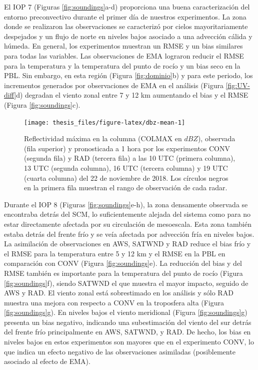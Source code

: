 \documentclass[12pt,oneside,a4paper]{reedthesis}
\begin{document}
El IOP 7 (Figuras \ref{fig:soundings}a-d) proporciona una buena caracterización del entorno preconvectivo durante el primer día de nuestros experimentos. La zona donde se realizaron las observaciones se caracterizó por cielos mayoritariamente despejados y un flujo de norte en niveles bajos asociado a una advección cálida y húmeda. En general, los experimentos muestran un RMSE y un bias similares para todas las variables. Las observaciones de EMA lograron reducir el RMSE para la temperatura y la temperatura del punto de rocío y un bias seco en la PBL. Sin embargo, en esta región (Figura \ref{fig:dominio}b) y para este periodo, los incrementos generados por observaciones de EMA en el análisis (Figura \ref{fig:UV-diff}d) degradan el viento zonal entre 7 y 12 km aumentando el bias y el RMSE (Figura \ref{fig:soundings}c).


\begin{figure}
\texttt{[image: thesis\_files/figure-latex/dbz-mean-1]} \caption{Reflectividad máxima en la columna (COLMAX en \(dBZ\)), observada (fila superior) y pronosticada a 1 hora por los experimentos CONV (segunda fila) y RAD (tercera fila) a las 10 UTC (primera columna), 13 UTC (segunda columna), 16 UTC (tercera columna) y 19 UTC (cuarta columna) del 22 de noviembre de 2018. Los círculos negros en la primera fila muestran el rango de observación de cada radar.}\label{fig:dbz-mean}
\end{figure}
Durante el IOP 8 (Figuras \ref{fig:soundings}e-h), la zona densamente observada se encontraba detrás del SCM, lo suficientemente alejada del sistema como para no estar directamente afectada por su circulación de mesoescala. Esta zona también estaba detrás del frente frío y se veía afectada por advección fría en niveles bajos. La asimilación de observaciones en AWS, SATWND y RAD reduce el bias frío y el RMSE para la temperatura entre 5 y 12 km y el RMSE en la PBL en comparación con CONV (Figura \ref{fig:soundings}e). La reducción del bias y del RMSE también es importante para la temperatura del punto de rocío (Figura \ref{fig:soundings}f), siendo SATWND el que muestra el mayor impacto, seguido de AWS y RAD. El viento zonal está sobrestimado en los análisis y sólo RAD muestra una mejora con respecto a CONV en la troposfera alta (Figura \ref{fig:soundings}g). En niveles bajos el viento meridional (Figura \ref{fig:soundings}g) presenta un bias negativo, indicando una subestimación del viento del sur detrás del frente frío principalmente en AWS, SATWND, y RAD. De hecho, los bias en niveles bajos en estos experimentos son mayores que en el experimento CONV, lo que indica un efecto negativo de las observaciones asimiladas (posiblemente asociado al efecto de EMA).
\end{document}

